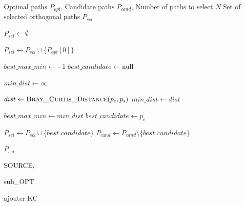 \documentclass[12pt, a4paper, twoside]{report}
\numberwithin{equation}{section}
\begin{document}
	\begin{algorithm}[H]
		\caption{Orthogonality Heuristic (HOG) - Max-Min Selection}
		\label{alg:hog_selection}
		\begin{algorithmic}[1]
			\Require Optimal paths $P_{opt}$, Candidate paths $P_{cand}$, Number of paths to select $N$
			\Ensure Set of selected orthogonal paths $P_{sel}$
			
			\State $P_{sel} \gets \emptyset$
			
			 
			\State $P_{sel} \gets P_{sel} \cup \{P_{opt}[0]\}$
			\EndIf
			
			\State $best\_max\_min \gets -1$
			\State $best\_candidate \gets \text{null}$
			
			  
			\State $min\_dist \gets \infty$
			
			   
			\State $dist \gets \Call{Bray\_Curtis\_Distance}{p_c, p_s}$ 
			\State $min\_dist \gets dist$
			\EndIf
			\EndFor
			
			 
			\State $best\_max\_min \gets min\_dist$
			\State $best\_candidate \gets p_c$
			\EndIf
			\EndFor
			
			\State $P_{sel} \gets P_{sel} \cup \{best\_candidate\}$
			\State $P_{cand} \gets P_{cand} \setminus \{best\_candidate\}$
			\EndWhile
			
			\State \Return $P_{sel}$
		\end{algorithmic}
	\end{algorithm}
	
	
	
	\newpage
	SOURCE, 
	
	
	sub\_OPT
	
	
	ajouter KC
	
	
	
	
	
	
	
	
	
	
	
	
	
	
	
	
	
	
	
	
	
	
	
\end{document}
